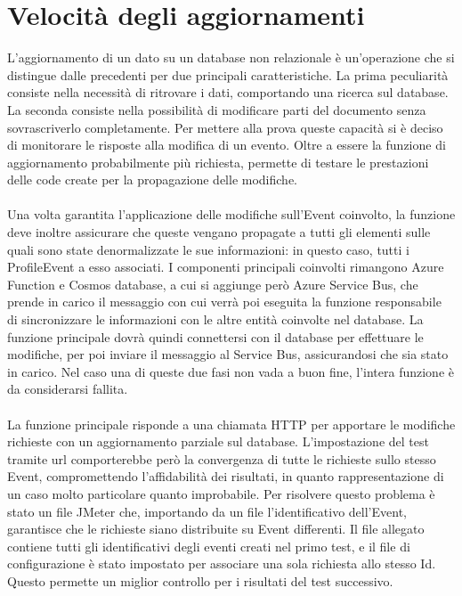 \section{Velocità degli aggiornamenti}
L'aggiornamento di un dato su un database non relazionale
è un'operazione che si distingue dalle precedenti per due principali caratteristiche.
La prima peculiarità consiste nella necessità di ritrovare i dati, 
comportando una ricerca sul database.
La seconda consiste nella possibilità di modificare parti del documento
senza sovrascriverlo completamente.
Per mettere alla prova queste capacità si è deciso di monitorare
le risposte alla modifica di un evento.
Oltre a essere la funzione di aggiornamento probabilmente più richiesta,
permette di testare le prestazioni delle code create per la propagazione delle modifiche.\\
\\
Una volta garantita l'applicazione delle modifiche sull'Event coinvolto, 
la funzione deve inoltre assicurare che queste vengano propagate 
a tutti gli elementi sulle quali sono state denormalizzate le sue informazioni:
in questo caso, tutti i ProfileEvent a esso associati.
I componenti principali coinvolti rimangono Azure Function e Cosmos database,
a cui si aggiunge però Azure Service Bus, 
che prende in carico il messaggio con cui verrà poi eseguita la funzione responsabile 
di sincronizzare le informazioni con le altre entità coinvolte nel database.
La funzione principale dovrà quindi connettersi con il database per effettuare le modifiche,
per poi inviare il messaggio al Service Bus, assicurandosi che sia stato in carico.
Nel caso una di queste due fasi non vada a buon fine, 
l'intera funzione è da considerarsi fallita.\\
\\
La funzione principale risponde a una chiamata HTTP 
per apportare le modifiche richieste con un aggiornamento parziale sul database.
L'impostazione del test tramite url comporterebbe però la convergenza di tutte le richieste
sullo stesso Event, compromettendo l'affidabilità dei risultati,
in quanto rappresentazione di un caso molto particolare quanto improbabile.
Per risolvere questo problema è stato un file JMeter che,
importando da un file l'identificativo dell'Event,
garantisce che le richieste siano distribuite su Event differenti.
Il file allegato contiene tutti gli identificativi degli eventi creati nel primo test,
e il file di configurazione è stato impostato per associare una sola richiesta allo stesso Id.
Questo permette un miglior controllo per i risultati del test successivo.
\clearpage

